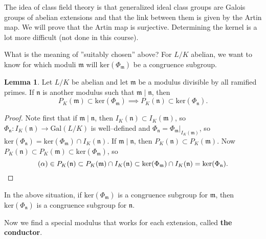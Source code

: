 \documentclass{article}
\theoremstyle{definition}
\newtheorem{lemma}[theorem]{Lemma}
\begin{document}
The idea of class field theory is that generalized ideal class groups are Galois groups of abelian extensions and that the link between them is given by the Artin map. We will prove that the Artin map is surjective. Determining the kernel is a lot more difficult (not done in this course).
\vspace{1mm}
 
What is the meaning of ''suitably chosen'' above? For $L/K$ abelian, we want to know for which moduli $\mathfrak{m}$ will $\text{ker}(\Phi_\mathfrak{m})$ be a congruence subgroup.
\begin{lemma}\label{lemma1.7}
    Let $L/K$ be abelian and let $\mathfrak{m}$ be a modulus divisible by all ramified primes. If $\mathfrak{n}$ is another modulus such that $\mathfrak{m} \mid \mathfrak{n}$, then \[
    P_K(\mathfrak{m}) \subset \text{ker}(\Phi_{\mathfrak{m}}) \implies P_K(\mathfrak{n}) \subset  \text{ker}(\Phi_{\mathfrak{n}}).
    \]
\end{lemma}
\begin{proof}
    Note first that if $\mathfrak{m} \mid \mathfrak{n}$, then $I_K(\mathfrak{n}) \subset I_K(\mathfrak{m})$, so $\Phi_\mathfrak{n} : I_K(\mathfrak{n}) \to \text{Gal}(L/K)$ is well--defined and $\Phi_{\mathfrak{n}} = \Phi_{\mathfrak{m}}|_{I_K(\mathfrak{m})}$, so $\text{ker}(\Phi_{\mathfrak{n}}) = \text{ker}(\Phi_{\mathfrak{m}}) \cap I_K(\mathfrak{n})$. If $\mathfrak{m} \mid \mathfrak{n}$, then $P_K(\mathfrak{n}) \subset P_K(\mathfrak{m})$. Now $P_K(\mathfrak{n}) \subset P_K(\mathfrak{m}) \subset \text{ker}(\Phi_{\mathfrak{m}})$, so \[
        (\alpha) \in P_K(\mathfrak{n}) \subset P_K(\mathfrak{m}) \cap I_K(\mathfrak{n}) \subset \text{ker}(\Phi_{\mathfrak{m}}) \cap I_K(\mathfrak{n}) = \text{ker}(\Phi_{\mathfrak{n}}).
        \qedhere
    \]
\end{proof}
In the above situation, if $\text{ker}(\Phi_{\mathfrak{m}})$ is a congruence subgroup for $\mathfrak{m}$, then $\text{ker}(\Phi_{\mathfrak{n}})$ is a congruence subgroup for $\mathfrak{n}$.
\vspace{1mm}
 
Now we find a special modulus that works for each extension, called \textbf{the conductor}. 

\end{document}
